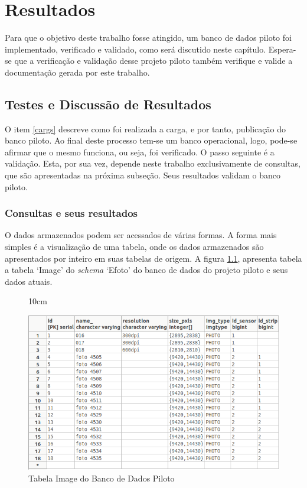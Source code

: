 \chapter{Resultados}\label{results}
Para que o objetivo deste trabalho fosse atingido, um banco de dados piloto foi implementado, verificado e validado, como será discutido neste capítulo. Espera-se que a verificação e validação desse projeto piloto também verifique e valide a documentação gerada por este trabalho.

\section{Testes e Discussão de Resultados} \label{carga}
O item \ref{cargs} descreve como foi realizada a carga, e por tanto, publicação do banco piloto. Ao final deste processo tem-se um banco operacional, logo, pode-se afirmar que o mesmo funciona, ou seja, foi verificado. O passo seguinte é a validação. Esta, por sua vez, depende neste trabalho exclusivamente de consultas, que são apresentadas na próxima subseção. Seus resultados validam o banco piloto. 

\subsection{Consultas e seus resultados}

O dados armazenados podem ser acessados de várias formas. A forma mais simples é a visualização de uma tabela, onde os dados armazenados são apresentados por inteiro em suas tabelas de origem. A figura \ref{efoto.img}, apresenta tabela a tabela `Image' do \textit{schema} `Efoto' do banco de dados do projeto piloto e seus dados atuais.

\begin{figure}[!ht]{10cm}
  \caption{Tabela Image do Banco de Dados Piloto} \label{efoto.img}
  \centering
  \includegraphics[width=1\hsize]{figuras/img_table.png}
\end{figure}

